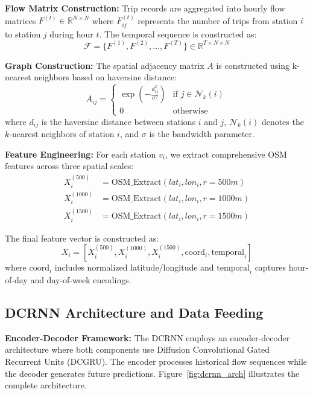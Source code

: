 \documentclass[twocolumn,11pt]{IEEEtran}
\begin{document}
\textbf{Flow Matrix Construction:}
Trip records are aggregated into hourly flow matrices $F^{(t)} \in \mathbb{R}^{N \times N}$ where $F_{ij}^{(t)}$ represents the number of trips from station $i$ to station $j$ during hour $t$. The temporal sequence is constructed as:
\begin{equation}
\mathcal{F} = \{F^{(1)}, F^{(2)}, ..., F^{(T)}\} \in \mathbb{R}^{T \times N \times N}
\end{equation}

\textbf{Graph Construction:}
The spatial adjacency matrix $A$ is constructed using k-nearest neighbors based on haversine distance:
\begin{equation}
A_{ij} = \begin{cases}
\exp(-\frac{d_{ij}^2}{\sigma^2}) & \text{if } j \in \mathcal{N}_k(i) \\
0 & \text{otherwise}
\end{cases}
\end{equation}
where $d_{ij}$ is the haversine distance between stations $i$ and $j$, $\mathcal{N}_k(i)$ denotes the $k$-nearest neighbors of station $i$, and $\sigma$ is the bandwidth parameter.

\textbf{Feature Engineering:}
For each station $v_i$, we extract comprehensive OSM features across three spatial scales:
\begin{align}
X_i^{(500)} &= \text{OSM\_Extract}(lat_i, lon_i, r=500m) \\
X_i^{(1000)} &= \text{OSM\_Extract}(lat_i, lon_i, r=1000m) \\
X_i^{(1500)} &= \text{OSM\_Extract}(lat_i, lon_i, r=1500m)
\end{align}

The final feature vector is constructed as:
\begin{equation}
X_i = [X_i^{(500)}, X_i^{(1000)}, X_i^{(1500)}, \text{coord}_i, \text{temporal}_i]
\end{equation}
where $\text{coord}_i$ includes normalized latitude/longitude and $\text{temporal}_i$ captures hour-of-day and day-of-week encodings.

\subsection{DCRNN Architecture and Data Feeding}

\textbf{Encoder-Decoder Framework:}
The DCRNN employs an encoder-decoder architecture where both components use Diffusion Convolutional Gated Recurrent Units (DCGRU). The encoder processes historical flow sequences while the decoder generates future predictions. Figure~\ref{fig:dcrnn_arch} illustrates the complete architecture.
\end{document}
